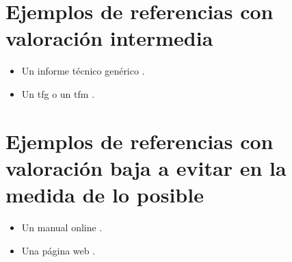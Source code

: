 \section{Ejemplos de referencias con valoración intermedia}

\begin{itemize}
  \item Un informe técnico genérico \cite{informe}.
  \item Un \gls{tfg} \cite{tfg} o un \gls{tfm} \cite{tfm}.
\end{itemize}

\section{Ejemplos de referencias con valoración baja a evitar en la medida de lo posible}
\begin{itemize}
  \item Un manual online \cite{manual}.
  \item Una página web \cite{website}.
\end{itemize}